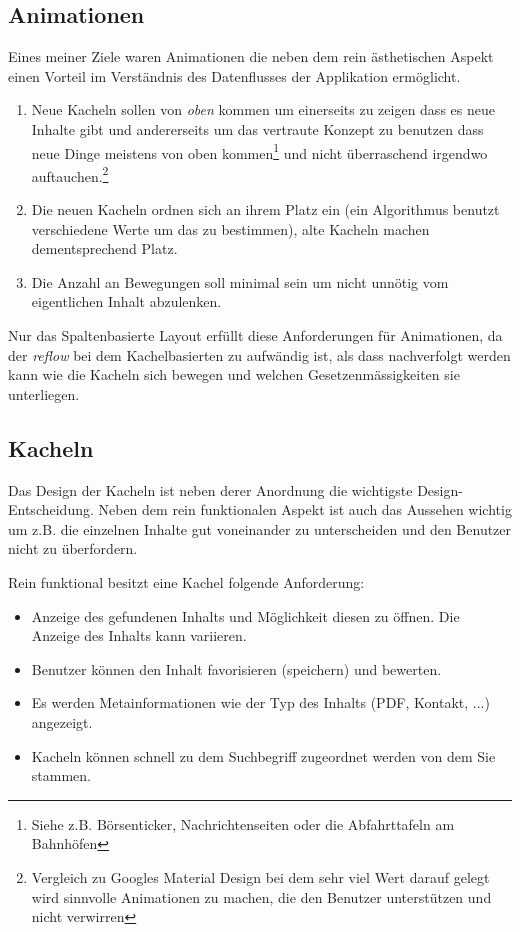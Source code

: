 \documentclass[12pt,twoside]{book}
\begin{document}
\subsection*{Animationen}

Eines meiner Ziele waren Animationen die neben dem rein ästhetischen Aspekt einen Vorteil im Verständnis des Datenflusses der Applikation ermöglicht.

\begin{enumerate}
  \item Neue Kacheln sollen von \textit{oben} kommen um einerseits zu zeigen dass es neue Inhalte gibt und andererseits um das vertraute Konzept zu benutzen dass neue Dinge meistens von oben kommen\footnote{Siehe z.B. Börsenticker, Nachrichtenseiten oder die Abfahrttafeln am Bahnhöfen} und nicht überraschend irgendwo auftauchen.\footnote{Vergleich zu Googles Material Design bei dem sehr viel Wert darauf gelegt wird sinnvolle Animationen zu machen, die den Benutzer unterstützen und nicht verwirren}
  \item Die neuen Kacheln ordnen sich an ihrem Platz ein (ein Algorithmus benutzt verschiedene Werte um das zu bestimmen), alte Kacheln machen dementsprechend Platz.
  \item Die Anzahl an Bewegungen soll minimal sein um nicht unnötig vom eigentlichen Inhalt abzulenken.
\end{enumerate}

Nur das Spaltenbasierte Layout erfüllt diese Anforderungen für Animationen, da der \textit{reflow} bei dem Kachelbasierten zu aufwändig ist, als dass nachverfolgt werden kann wie die Kacheln sich bewegen und welchen Gesetzenmässigkeiten sie unterliegen.

\subsection*{Kacheln}

Das Design der Kacheln ist neben derer Anordnung die wichtigste Design-Entscheidung. Neben dem rein funktionalen Aspekt ist auch das Aussehen wichtig um z.B. die einzelnen Inhalte gut voneinander zu unterscheiden und den Benutzer nicht zu überfordern.

Rein funktional besitzt eine Kachel folgende Anforderung:

\begin{itemize}
  \item Anzeige des gefundenen Inhalts und Möglichkeit diesen zu öffnen. Die Anzeige des Inhalts kann variieren.
  \item Benutzer können den Inhalt favorisieren (speichern) und bewerten.
  \item Es werden Metainformationen wie der Typ des Inhalts (PDF, Kontakt, ...) angezeigt.
  \item Kacheln können schnell zu dem Suchbegriff zugeordnet werden von dem Sie stammen.
\end{itemize}
\end{document}
